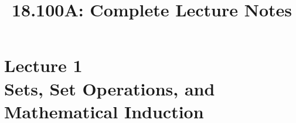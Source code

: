 \documentclass{article}
\title{18.100A: Complete Lecture Notes}
\date{}
\begin{document}
\maketitle









\tableofcontents
\newpage
   
\section[ Sets, Set Operations, and Mathematical Induction]{Lecture 1 \\ {\normalsize Sets, Set Operations, and Mathematical Induction}} \newpage 
\end{document}
